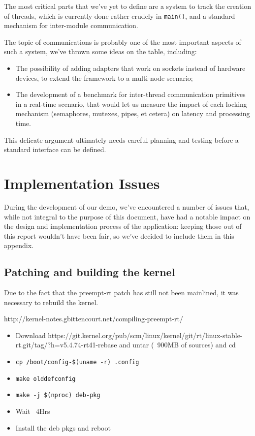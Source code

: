 \documentclass[a4paper,12pt]{report}
\begin{document}
The most critical parts that we've yet to define are a system to track the creation of threads, which is currently done rather crudely in \texttt{main()}, and a standard mechanism for inter-module communication.

The topic of communications is probably one of the most important aspects of such a system, we've thrown some ideas on the table, including:

\begin{itemize}
    \item The possibility of adding adapters that work on sockets instead of hardware devices, to extend the framework to a multi-node scenario;
    \item The development of a benchmark for inter-thread communication primitives in a real-time scenario, that would let us measure the impact of each locking mechanism (semaphores, mutexes, pipes, et cetera) on latency and processing time.
\end{itemize}

This delicate argument ultimately needs careful planning and testing before a standard interface can be defined.

\newpage
\chapter{Implementation Issues}

During the development of our demo, we've encountered a number of issues that, while not integral to the purpose of this document, have had a notable impact on the design and implementation process of the application: keeping those out of this report wouldn't have been fair, so we've decided to include them in this appendix. 

\section{Patching and building the kernel}

Due to the fact that the preempt-rt patch has still not been mainlined, it was necessary to rebuild the kernel. 

http://kernel-notes.gbittencourt.net/compiling-preempt-rt/

\begin{itemize}
    \item Download https://git.kernel.org/pub/scm/linux/kernel/git/rt/linux-stable-rt.git/tag/?h=v5.4.74-rt41-rebase and untar (~900MB of sources) and cd
    \item \texttt{cp /boot/config-\$(uname -r) .config}
    \item \texttt{make olddefconfig}
    \item \texttt{make -j \$(nproc) deb-pkg}
    \item Wait ~4Hrs
    \item Install the deb pkgs and reboot
\end{itemize}
\end{document}
